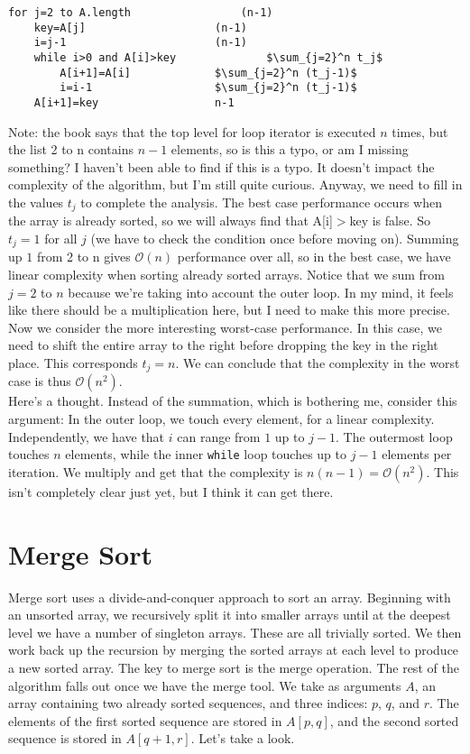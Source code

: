 \documentclass[12pt,english]{article}
\begin{document}
\begin{lstlisting}[mathescape=true]
for j=2 to A.length					(n-1)
	key=A[j]					(n-1)
	i=j-1						(n-1)
	while i>0 and A[i]>key				$\sum_{j=2}^n t_j$ 	
		A[i+1]=A[i]				$\sum_{j=2}^n (t_j-1)$ 
		i=i-1					$\sum_{j=2}^n (t_j-1)$ 
	A[i+1]=key					n-1
\end{lstlisting}


Note: the book says that the top level for loop iterator is executed $n$ times, but the list 2 to n contains $n-1$ elements, so is this a typo, or am I missing something?  I haven't been able to find if this is a typo.  It doesn't impact the complexity of the algorithm, but I'm still quite curious.  Anyway, we need to fill in the values $t_j$ to complete the analysis.  The best case performance occurs when the array is already sorted, so we will always find that A[i]$>$key is false.  So $t_j = 1$ for all $j$ (we have to check the condition once before moving on).  Summing up $1$ from 2 to n gives $\mathcal{O}(n)$ performance over all, so in the best case, we have linear complexity when sorting already sorted arrays.  Notice that we sum from $j=2$ to $n$ because we're taking into account the outer loop.  In my mind, it feels like there should be a multiplication here, but I need to make this more precise. \\

Now we consider the more interesting worst-case performance.  In this case, we need to shift the entire array to the right before dropping the key in the right place.  This corresponds $t_j = n$.  We can conclude that the complexity in the worst case is thus $\mathcal{O}(n^2)$.   \\

Here's a thought.  Instead of the summation, which is bothering me, consider this argument:  In the outer loop, we touch every element, for a linear complexity.  Independently, we have that $i$ can range from $1$ up to $j-1$.   The outermost loop touches $n$ elements, while the inner \texttt{while} loop touches up to $j-1$ elements per iteration.  We multiply and get that the complexity is $n(n-1) = \mathcal{O}(n^2)$.  This isn't completely clear just yet, but I think it can get there.

\section{Merge Sort}

Merge sort uses a divide-and-conquer approach to sort an array.  Beginning with an unsorted array, we recursively split it into smaller arrays until at the deepest level we have a number of singleton arrays.  These are all trivially sorted.  We then work back up the recursion by merging the sorted arrays at each level to produce a new sorted array.  The key to merge sort is the merge operation.  The rest of the algorithm falls out once we have the merge tool.  We take as arguments $A$, an array containing two already sorted sequences, and three indices: $p$, $q$, and $r$. The elements of the first sorted sequence are stored in $A[p,q]$, and the second sorted sequence is stored in $A[q+1,r]$.  Let's take a look.
\end{document}
